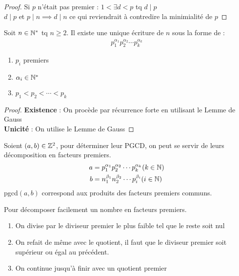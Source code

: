 \begin{proof}
Si $p$ n'était pas premier : $1 < \exists d < p$ tq $d \mid p$
\\
$d \mid p$ et $p \mid n \implies d \mid n$ ce qui reviendrait à contredire la minimialité de $p$
\end{proof}

\begin{graybox}
\begin{theoreme}
Soit $n \in \mathbb{N}^*$ tq $n \geq 2$. 
Il existe une unique écriture de $n$ sous la forme de :
\begin{align*}
p_1^{\alpha_1} p_2^{\alpha_2}  \cdots p_k^{\alpha_k}
\end{align*}
\begin{enumerate}
\item $p_i$ premiers
\item $\alpha_i \in \mathbb{N}^*$
\item $p_1 < p_2 < \cdots < p_k$
\end{enumerate}
\end{theoreme}
\end{graybox}

\begin{proof}
\textbf{Existence} : On procède par récurrence forte en utilisant le Lemme de Gauss \\
\textbf{Unicité} : On utilise le Lemme de Gauss
\end{proof}

\begin{graybox}
\begin{proposition}
Soient $(a, b) \in \mathbb{Z}^2$, pour déterminer leur PGCD, on peut se servir de leurs décomposition en facteurs premiers.
\begin{align*}
a &= p_1^{\alpha_1} p_2^{\alpha_2} \cdots p_k^{\alpha_k} (k \in \mathbb{N})\\
b &= n_1^{\beta_1} n_2^{\beta_2} \cdots p_i^{\beta_i} (i \in \mathbb{N})
\end{align*}
pgcd$(a, b)$ correspond aux produits des facteurs premiers communs.
\end{proposition}
\end{graybox}

\begin{remarque}
Pour décomposer facilement un nombre en facteurs premiers. \begin{enumerate}
\item On divise par le diviseur premier le plus faible tel que le reste soit nul
\item On refait de même avec le quotient, il faut que le diviseur premier soit supérieur ou égal au précédent.
\item On continue jusqu'à finir avec un quotient premier
\end{enumerate}
\end{remarque}

